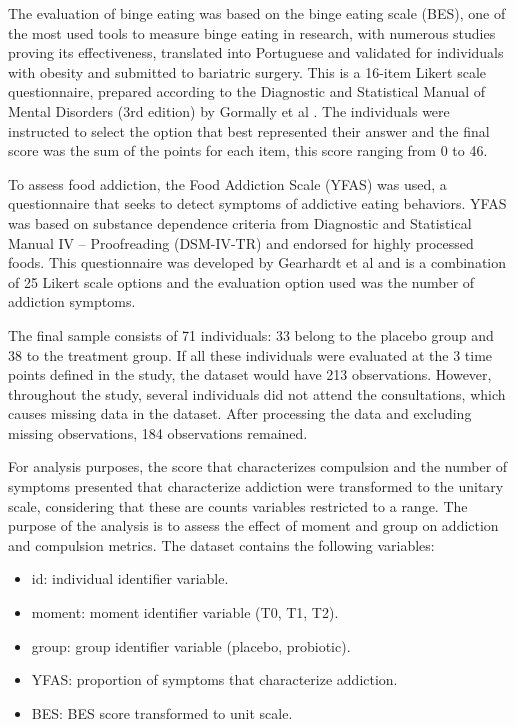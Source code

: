 \documentclass[USenglish]{article}
\theoremstyle{dgthm}
\theoremstyle{dgdef}
\begin{document}
The evaluation of binge eating was based on the binge eating scale (BES), one of the most used tools to measure binge eating in research, with numerous studies proving its effectiveness, translated into Portuguese and validated for individuals with obesity and submitted to bariatric surgery. This is a 16-item Likert scale questionnaire, prepared according to the Diagnostic and Statistical Manual of Mental Disorders (3rd edition) \cite{spitzer1980diagnostic} by Gormally et al \cite{gormally1982assessment}. The individuals were instructed to select the option that best represented their answer and the final score was the sum of the points for each item, this score ranging from 0 to 46.

To assess food addiction, the Food Addiction Scale (YFAS) was used, a questionnaire that seeks to detect symptoms of addictive eating behaviors. YFAS was based on substance dependence criteria from Diagnostic and Statistical Manual IV – Proofreading (DSM-IV-TR) \cite{segal2010diagnostic} and endorsed for highly processed foods. This questionnaire was developed by Gearhardt et al \cite{gearhardt2009preliminary} and is a combination of 25 Likert scale options and the evaluation option used was the number of addiction symptoms.


The final sample consists of 71 individuals: 33 belong to the placebo group and 38 to the treatment group. If all these individuals were evaluated at the 3 time points defined in the study, the dataset would have 213 observations. However, throughout the study, several individuals did not attend the consultations, which causes missing data in the dataset. After processing the data and excluding missing observations, 184 observations remained.


For analysis purposes, the score that characterizes compulsion and the number of symptoms presented that characterize addiction were transformed to the unitary scale, considering that these are counts variables restricted to a range. The purpose of the analysis is to assess the effect of moment and group on addiction and compulsion metrics. The dataset contains the following variables:

\begin{itemize}
  \item id: individual identifier variable.
  \item moment: moment identifier variable (T0, T1, T2).
  \item group: group identifier variable (placebo, probiotic).
  \item YFAS: proportion of symptoms that characterize addiction.
  \item BES: BES score transformed to unit scale.
\end{itemize}
\end{document}
